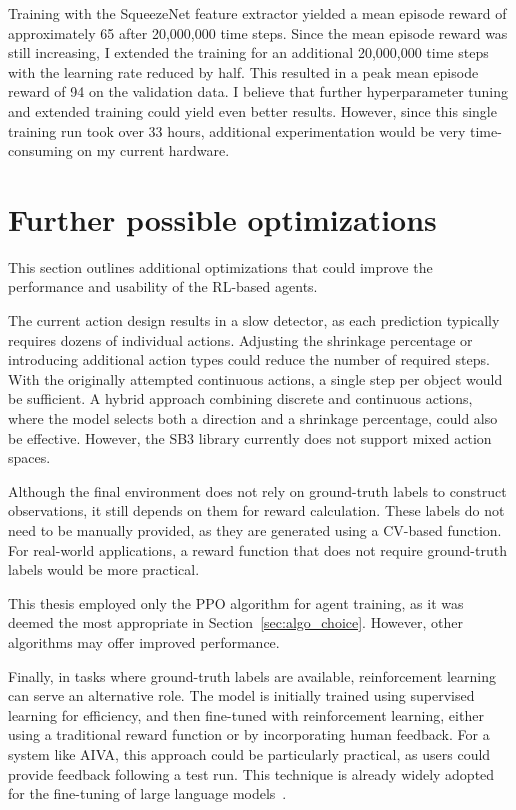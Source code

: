 \documentclass[
  digital,     %
  oneside,     %
  nosansbold,  %
  nocolorbold, %
  lof,         %
  lot,         %
]{fithesis4}
\begin{document}
Training with the SqueezeNet feature extractor yielded a mean episode reward of approximately 65 after 20,000,000 time steps. Since the mean episode reward was still increasing, I extended the training for an additional 20,000,000 time steps with the learning rate reduced by half. This resulted in a peak mean episode reward of 94 on the validation data. I believe that further hyperparameter tuning and extended training could yield even better results. However, since this single training run took over 33 hours, additional experimentation would be very time-consuming on my current hardware.

\section{Further possible optimizations}
\label{sec:further_optim}

This section outlines additional optimizations that could improve the performance and usability of the RL-based agents.

The current action design results in a slow detector, as each prediction typically requires dozens of individual actions. Adjusting the shrinkage percentage or introducing additional action types could reduce the number of required steps. With the originally attempted continuous actions, a single step per object would be sufficient. A hybrid approach combining discrete and continuous actions, where the model selects both a direction and a shrinkage percentage, could also be effective. However, the SB3 library currently does not support mixed action spaces.

Although the final environment does not rely on ground-truth labels to construct observations, it still depends on them for reward calculation. These labels do not need to be manually provided, as they are generated using a CV-based function. For real-world applications, a reward function that does not require ground-truth labels would be more practical.

This thesis employed only the PPO algorithm for agent training, as it was deemed the most appropriate in Section~\ref{sec:algo_choice}. However, other algorithms may offer improved performance.

Finally, in tasks where ground-truth labels are available, reinforcement learning can serve an alternative role. The model is initially trained using supervised learning for efficiency, and then fine-tuned with reinforcement learning, either using a traditional reward function or by incorporating human feedback. For a system like AIVA, this approach could be particularly practical, as users could provide feedback following a test run. This technique is already widely adopted for the fine-tuning of large language models~\cite{LLM-RLHF}.
\end{document}
